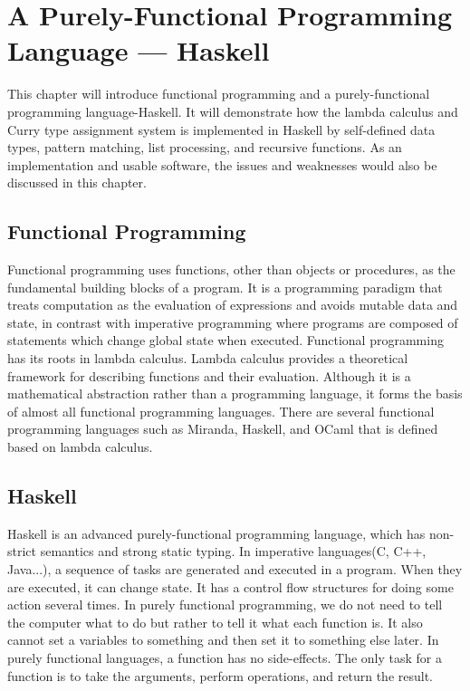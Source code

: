 \chapter{A Purely-Functional Programming Language --- Haskell}\label{chap:haskell}

This chapter will introduce functional programming and a purely-functional programming language-Haskell. It will demonstrate how the lambda calculus and Curry type assignment system is implemented in Haskell by self-defined data types, pattern matching, list processing, and recursive functions. As an implementation and usable software, the issues and weaknesses would also be discussed in this chapter. 
\section{Functional Programming}
Functional programming uses functions, other than objects or procedures, as the fundamental building blocks of a program. It is a programming paradigm that treats computation as the evaluation of expressions and avoids mutable data and state, in contrast with imperative programming where programs are composed of statements which change global state when executed. Functional programming has its roots in lambda calculus. Lambda calculus provides a theoretical framework for describing functions and their evaluation. Although it is a mathematical abstraction rather than a programming language, it forms the basis of almost all functional programming languages. There are several functional programming languages such as Miranda, Haskell, and OCaml that is defined based on lambda calculus. 
\section{Haskell}
Haskell is an advanced purely-functional programming language, which has non-strict semantics and strong static typing. In imperative languages(C, C++, Java...), a sequence of tasks are generated and executed in a program. When they are executed, it can change state. It has a control flow structures for doing some action several times. In purely functional programming, we do not need to tell the computer what to do but rather to tell it what each function is. It also cannot set a variables to something and then set it to something else later. In purely functional languages, a function has no side-effects. The only task for a function is to take the arguments, perform operations, and return the result.  

